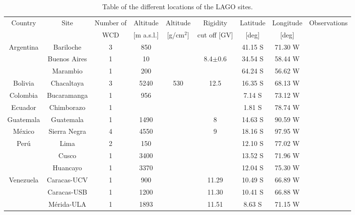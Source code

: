 \begin{table}[!ht]
\begin{center}
\setlength{\tabcolsep}{0.2em}
\begin{tabular}{|c|c|c|c|c|c|c|c|c|}
\hline
\multirow{2}{*}{Country} & \multirow{2}{*}{Site} & Number of & Altitude & Altitude & Rigidity & Latitude &Longitude& \multirow{2}{*}{Observations}\\
 & & WCD & [m a.s.l.] & [g/cm$^2$] & cut off [GV] & [deg] & [deg] & \\
\hline
\hline
 \multirow{3}{*}{Argentina} &Bariloche &3&850 & & & 41.15 S& 71.30 W & \\
&Buenos Aires &1& 10& & 8.4$\pm$0.6 & 34.54 S & 58.44 W & \\
&Marambio &1& 200 & & & 64.24 S & 56.62 W & \\
\hline
Bolivia & Chacaltaya & 3 & 5240 & 530 & 12.5 & 16.35 S& 68.13 W & \\
\hline
Colombia & Bucaramanga & 1 & 956 &  & & 7.14 S& 73.12 W & \\
\hline
Ecuador & Chimborazo & 1 &  &  & & 1.81 S& 78.74 W & \\
\hline
Guatemala & Guatemala & 1 & 1490 &  & 8& 14.63 S& 90.59 W & \\
\hline
México & Sierra Negra & 4 & 4550 &  & 9& 18.16 S& 97.95 W & \\
\hline
\multirow{3}{*}{Perú} & Lima & 2  &150  &  & & 12.10 S& 77.02 W& \\
 & Cusco & 1& 3400 &  & & 13.52 S& 71.96 W& \\
 & Huancayo & 1& 3370 &  & & 12.04 S& 75.30 W& \\
\hline
 \multirow{3}{*}{Venezuela} &Caracas-UCV &1& 900& & 11.29 & 10.49 S & 66.89 W & \\
&Caracas-USB  &1& 1200& & 11.30 & 10.41 S & 66.88 W & \\
&M\'erida-ULA &1& 1893& &11.51 & 8.63 S & 71.15 W & \\
\hline
\end{tabular}
\caption{Table of the different locations of the LAGO sites.}
\label{tab:locations}
\end{center}
\end{table}

